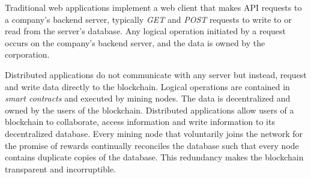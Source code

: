 Traditional web applications implement a web client that makes API requests to a company's backend server,
typically \emph{GET} and \emph{POST} requests to write to or read from the server's database.
Any logical operation initiated by a request occurs on the company's backend server, and the data is owned by the corporation.

Distributed applications do not communicate with any server but instead, request and write data directly to the blockchain.
Logical operations are contained in \emph{smart contracts} and executed by mining nodes.
The data is decentralized and owned by the users of the blockchain.
Distributed applications allow users of a blockchain to collaborate, access information and write information to its decentralized database.
Every mining node that voluntarily joins the network for the promise of rewards continually reconciles the database such that every node
contains duplicate copies of the database.
This redundancy makes the blockchain transparent and incorruptible.

